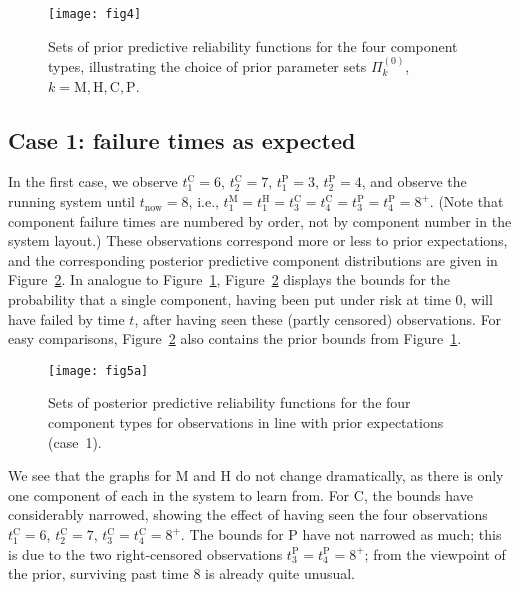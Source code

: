 \documentclass[Journal,SectionNumbers,InsideFigs]{ascelike}
\newcommand{\uz}{^{(0)}} %
\def\PkZ{\Pi\uz_k}
\def\tnow{t_\text{now}}
\begin{document}
\begin{figure}
\texttt{[image: fig4]}
\caption{Sets of prior predictive reliability functions for the four component types,
illustrating the choice of prior parameter sets $\PkZ$, $k=\text{M}, \text{H}, \text{C}, \text{P}$.}
\label{fig:brake-comppriors}
\end{figure}


\subsection{Case 1: failure times as expected}
\label{sec:ex-case1}

In the first case, we observe $t_1^\text{C} = 6$, $t_2^\text{C} = 7$, $t_1^\text{P} = 3$, $t_2^\text{P} = 4$,
and observe the running system until $\tnow = 8$,
i.e., $t_1^\text{M} = t_1^\text{H} = t_3^\text{C} = t_4^\text{C} = t_3^\text{P} = t_4^\text{P} = 8^+$.
(Note that component failure times are numbered by order, not by component number in the system layout.)
These observations correspond more or less to prior expectations,
and the corresponding posterior predictive component distributions are given in Figure~\ref{fig:comppost-1}.
In analogue to Figure~\ref{fig:brake-comppriors},
Figure~\ref{fig:comppost-1} displays the bounds for the probability that a single component,
having been put under risk at time $0$, will have failed by time $t$,
after having seen these (partly censored) observations.
For easy comparisons, Figure~\ref{fig:comppost-1} also contains the prior bounds from Figure~\ref{fig:brake-comppriors}.

\begin{figure}
\texttt{[image: fig5a]}
\caption{Sets of posterior predictive reliability functions for the four component types
for observations in line with prior expectations (case~1).}
\label{fig:comppost-1}
\end{figure}

We see that the graphs for M and H do not change dramatically,
as there is only one component of each in the system to learn from.
For C, the bounds have considerably narrowed,
showing the effect of having seen the four observations
$t_1^\text{C} = 6$, $t_2^\text{C} = 7$, $t_3^\text{C} = t_4^\text{C} = 8^+$.
The bounds for P have not narrowed as much;
this is due to the two right-censored observations $t_3^\text{P} = t_4^\text{P} = 8^+$;
from the viewpoint of the prior, surviving past time 8 is already quite unusual.
\end{document}
